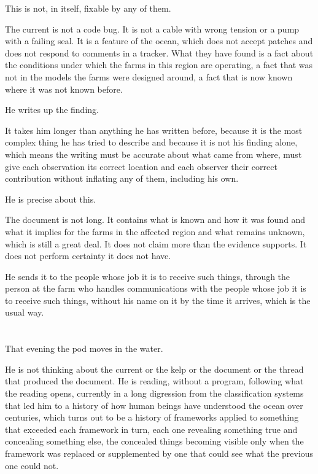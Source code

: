 This is not, in itself, fixable by any of them.

The current is not a code bug. It is not a cable
with wrong tension or a pump with a failing seal.
It is a feature of the ocean, which does not
accept patches and does not respond to comments
in a tracker. What they have found is a fact
about the conditions under which the farms in
this region are operating, a fact that was not
in the models the farms were designed around,
a fact that is now known where it was not known
before.

He writes up the finding.

It takes him longer than anything he has written
before, because it is the most complex thing he
has tried to describe and because it is not his
finding alone, which means the writing must be
accurate about what came from where, must give
each observation its correct location and each
observer their correct contribution without
inflating any of them, including his own.

He is precise about this.

The document is not long. It contains what is
known and how it was found and what it implies
for the farms in the affected region and what
remains unknown, which is still a great deal.
It does not claim more than the evidence supports.
It does not perform certainty it does not have.

He sends it to the people whose job it is to
receive such things, through the person at the
farm who handles communications with the people
whose job it is to receive such things, without
his name on it by the time it arrives, which
is the usual way.

\section{}

That evening the pod moves in the water.

He is not thinking about the current or the
kelp or the document or the thread that produced
the document. He is reading, without a program,
following what the reading opens, currently in
a long digression from the classification systems
that led him to a history of how human beings
have understood the ocean over centuries, which
turns out to be a history of frameworks applied
to something that exceeded each framework in turn,
each one revealing something true and concealing
something else, the concealed things becoming
visible only when the framework was replaced or
supplemented by one that could see what the
previous one could not.

